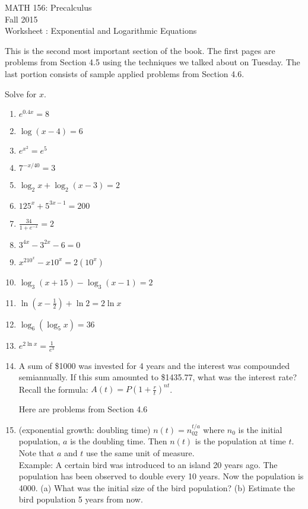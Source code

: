 \documentclass[11pt]{article}
\newcommand{\sect}{\textsection}
\begin{document}
 

\begin{center}MATH 156: Precalculus  \\ Fall 2015 \\ Worksheet \sect 4.5: Exponential and Logarithmic Equations\end{center}

\hrulefill

This is the second most important section of the book. The first pages are problems from Section 4.5 using the techniques we talked about on Tuesday. The last portion consists of sample applied problems from Section 4.6.\

\hrulefill

Solve for $x.$
\begin{enumerate}
\item $e^{0.4x}=8$
\vfill
\item $\log (x-4)=6$
\vfill
\item $e^{x^2}=e^5 $
\vfill
\item $7^{-x/40}=3$
\vfill
\item $ \log_2x + \log_2(x-3)=2$
\vfill
\newpage
\item $125^x+5^{3x-1}=200$
\vfill
\item $\frac{34}{1+e^{-x}}=2$
\vfill

\item $3^{4x}-3^{2x}-6=0$
\vfill
\item $x^210^x-x10^x=2(10^x)$
\vfill
\item $ \log_3(x+15)-\log_3(x-1)=2$
\vfill
\newpage
\item $\ln (x-\frac{1}{2})+\ln 2=2 \ln x $
\vfill
\item $\log_6(\log_5 x ) = 36 $
\vfill
\item $ e^{2\ln x}=\frac{1}{e^3}$
\vfill
\item A sum of \$1000 was invested for 4 years and the interest was compounded semiannually. If this sum amounted to \$1435.77, what was the interest rate? Recall the formula: $A(t)=P(1+\frac{r}{t})^{nt}$.
\vfill
\newpage
\begin{center}
Here are problems from Section 4.6
\end{center}
\item (exponential growth: doubling time) $n(t)=n_02^{t/a}$ where $n_0$ is the initial population, $a$ is the doubling time. Then $n(t)$ is the population at time $t.$ Note that $a$ and $t$ use the same unit of measure.\\

Example: A certain bird was introduced to an island 20 years ago. The population has been observed to double every 10 years. Now the population is 4000. (a) What was the initial size of the bird population? (b) Estimate the bird population 5 years from now.


\end{enumerate}
\end{document}

